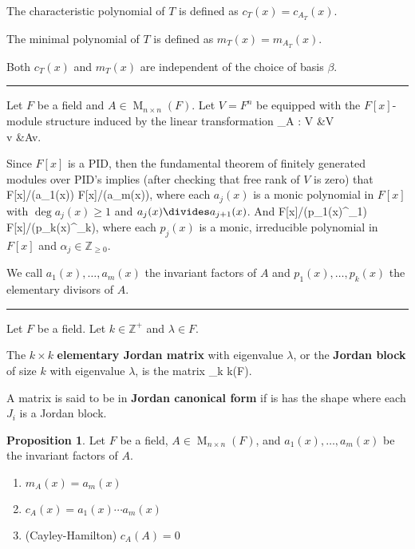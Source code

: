 \documentclass[12pt]{article}
\newcommand{\keyword}[1]{\textbf{#1}}
\def\[#1\]{\begin{align*}#1\end{align*}}
\newcommand{\sepline}{\rule{\textwidth}{0.4pt}}
\theoremstyle{definition}
\newtheorem{proposition}{Proposition}
\newcommand{\Z}{\mathbb{Z}}
\newcommand{\<}{\left\langle}
\renewcommand{\>}{\right\rangle}
\newcommand{\isom}{\cong}
\newcommand{\sqMat}[1]{\operatorname{M}_{#1 \times #1}}
\newcommand{\MnF}{\sqMat{n}(F)}
\begin{document}
The characteristic polynomial of $T$ is defined as $c_T(x) = c_{A_T}(x)$.

The minimal polynomial of $T$ is defined as $m_T(x) = m_{A_T}(x)$.

Both $c_T(x)$ and $m_T(x)$ are independent of the choice of basis $\beta$.

\sepline

Let $F$ be a field and $A \in \MnF$. Let $V = F^n$ be equipped with the $F[x]$-module structure induced by the linear transformation
\[
    T_A : V &\to V \\
    v &\mapsto Av.
\]

Since $F[x]$ is a PID, then the fundamental theorem of finitely generated modules over PID's implies (after checking that free rank of $V$ is zero) that
\[
    V \isom F[x]/(a_1(x)) \dsum \cdots \dsum F[x]/(a_m(x)),
\]
where each $a_j(x)$ is a monic polynomial in $F[x]$ with $\deg a_j(x) \geq 1$ and $a_j(x) \divides a_{j+1}(x)$. And
\[
    V \isom F[x]/(p_1(x)^{\alpha_1}) \dsum \cdots \dsum F[x]/(p_k(x)^{\alpha_k}),
\]
where each $p_j(x)$ is a monic, irreducible polynomial in $F[x]$ and $\alpha_j \in \Z_{\geq 0}$.

We call $a_1(x), \dots, a_m(x)$ the invariant factors of $A$ and $p_1(x), \dots, p_k(x)$ the elementary divisors of $A$.

\sepline

Let $F$ be a field. Let $k \in \Z^+$ and $\lambda \in F$.

The $k \times k$ \keyword{elementary Jordan matrix} with eigenvalue $\lambda$, or the \keyword{Jordan block} of size $k$ with eigenvalue $\lambda$, is the matrix
\[
    \mqty[
        \lambda & 1 & & 0 \\
        & \lambda & \ddots  \\
        && \ddots & 1 \\
        0&&& \lambda 
    ]
    \in \sqMat{k}(F).
\]

A matrix is said to be in \keyword{Jordan canonical form} if is has the shape
\[
    \mqty[\dmat{J_1, J_2, \ddots, J_t}]
\]
where each $J_i$ is a Jordan block.



\newpage

\begin{proposition}
    Let $F$ be a field, $A \in \MnF$, and $a_1(x), \dots, a_m(x)$ be the invariant factors of $A$.
    \begin{enumerate}[(1)]
        \item $m_A(x) = a_m(x)$
        \item $c_A(x) = a_1(x) \cdots a_m(x)$
        \item (Cayley-Hamilton) $c_A(A) = 0$
    \end{enumerate}
\end{proposition}
\end{document}
